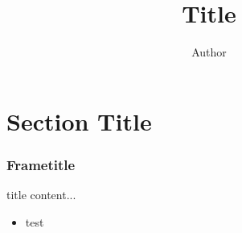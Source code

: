 \documentclass{beamer}
\author{Author}
\title{Title}
\institute{Institute}
\begin{document}
\begin{frame}
\titlepage
\end{frame}

\section{Section Title}

\begin{frame}
  \frametitle{Frametitle}
  \begin{block}{title}
  content...
  \end{block}
  
  \begin{itemize}
  \item test
  \end{itemize}
\end{frame}
\end{document}
